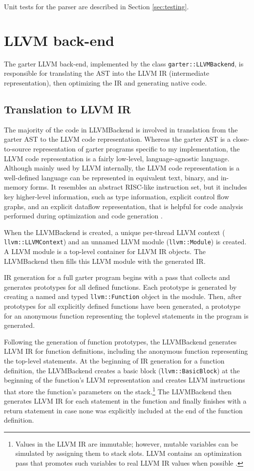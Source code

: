 \documentclass[11pt]{article}
\begin{document}
Unit tests for the parser are described in Section \ref{sec:testing}.

\section{LLVM back-end}

The garter LLVM back-end, implemented by the class {\tt garter::LLVMBackend}, is
responsible for translating the AST into the LLVM IR (intermediate
representation), then optimizing the IR and generating native
code.

\subsection{Translation to LLVM IR}

The majority of the code in LLVMBackend is involved in translation from the
garter AST to the LLVM code representation.  Whereas the garter AST is a
close-to-source representation of garter programs specific to my implementation,
the LLVM code representation is a fairly low-level, language-agnostic language.
Although mainly used by LLVM internally, the LLVM code representation is a
well-defined language can be represented in equivalent text, binary, and
in-memory forms.  It resembles an abstract RISC-like instruction set, but it
includes key higher-level information, such as type information, explicit
control flow graphs, and an explicit dataflow representation, that is helpful
for code analysis performed during optimization and code generation
\cite{lattner2004llvm}.

When the LLVMBackend is created, a unique per-thread LLVM context ({\tt
llvm::LLVMContext}) and an unnamed LLVM module ({\tt llvm::Module}) is created.
A LLVM module is a top-level container for LLVM IR objects.  The LLVMBackend
then fills this LLVM module with the generated IR.

IR generation for a full garter program begins with a pass that collects and
generates prototypes for all defined functions.  Each prototype is generated by
creating a named and typed {\tt llvm::Function} object in the module.
Then, after prototypes for all explicitly defined functions have been generated,
a prototype for an anonymous function representing the toplevel statements in
the program is generated.

Following the generation of function prototypes, the LLVMBackend generates LLVM
IR for function definitions, including the anonymous function representing the
top-level statements.  At the beginning of IR generation for a function
definition, the LLVMBackend creates a basic block ({\tt llvm::BasicBlock}) at
the beginning of the function's LLVM representation and creates LLVM
instructions that store the function's parameters on the stack.\footnote{Values
    in the LLVM IR are immutable; however, mutable variables can be simulated by
assigning them to stack slots.  LLVM contains an optimization pass that promotes
such variables to real LLVM IR values when possible \cite{kaleidoscope}.} The
LLVMBackend then generates LLVM IR for each statement in the function and
finally finishes with a return statement in case none was explicitly included at
the end of the function definition.
\end{document}
